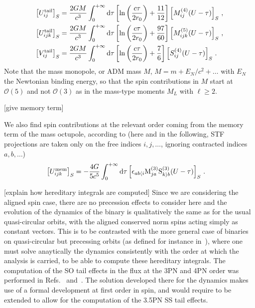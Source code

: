\documentclass[
superscriptaddress,
preprint,
prd,tightenlines,showpacs,nofootinbib,
eqsecnum,
amsfonts,amsmath,amssymb]{revtex4-1}
\newcommand{\ud}{\mathrm{d}}
\newcommand{\calO}{\mathcal{O}}
\begin{document}
\begin{subequations}
\begin{align}
	\left[U_{ij}^{\rm tail} \right]_{S} &= \frac{2G M}{c^3} \int^{+\infty}_{0} \ud \tau \left[ \ln \left(\frac{c\tau}{2r_0}\right)+\frac{11}{12} \right] \left[ M^{(4)}_{ij} (U-\tau) \right]_{S} \,,\\
	\left[U_{ijk}^{\rm tail} \right]_{S} &= {2G M\over c^3} \int^{+\infty}_{0} \ud\tau\left[ \ln \left(\frac{c\tau}{2r_0}\right)+{97\over60} \right] \left[ M^{(5)}_{ijk} (U-\tau) \right]_{S} \,,\\
	\left[V_{ij}^{\rm tail} \right]_{S} &= {2G M\over c^3} \int^{+\infty}_{0} \ud\tau \left[ \ln \left(\frac{c\tau}{2r_0}\right)+{7\over6} \right] \left[ S^{(4)}_{ij} (U-\tau) \right]_{S} \,.
\end{align}
\end{subequations}
Note that the mass monopole, or ADM mass $M$, $M = m + E_{N}/c^{2} + \dots$ with $E_{N}$ the Newtonian binding energy, so that the spin contributions in $M$ start at $\calO(5)$ and not $\calO(3)$ as in the mass-type moments $M_{L}$ with $\ell \geq 2$.

[give memory term]

We also find spin contributions at the relevant order coming from the memory term of the mass octupole, according to (here and in the following, STF projections are taken only on the free indices $i,j,\dots$, ignoring contracted indices $a,b,\dots$)
\begin{align}
	\left[U_{ijk}^{\rm mem} \right]_{S} &= -{4G\over 5 c^5} \int^{+\infty}_{0} \ud\tau \left[ \epsilon_{ab\langle i} \mathrm{M}^{(3)}_{ja} \mathrm{S}^{(3)}_{k\rangle b} (U-\tau) \right]_{S}\,.
\end{align}

[explain how hereditary integrals are computed]
Since we are considering the aligned spin case, there are no precession effects to consider here and the evolution of the dynamics of the binary is qualitatively the same as for the usual quasi-circular orbits, with the aligned conserved norm spins acting simply as constant vectors. This is to be contrasted with the more general case of binaries on quasi-circular but precessing orbits (as defined for instance in~\cite{}), where one must solve anaytically the dynamics consistently with the order at which the analysis is carried, to be able to compute these hereditary integrals. The computation of the SO tail effects in the flux at the 3PN and 4PN order was performed in Refs.~\cite{} and~\cite{}. The solution developed there for the dynamics makes use of a formal development at first order in spin, and would require to be extended to allow for the computation of the 3.5PN SS tail effects.
\end{document}

